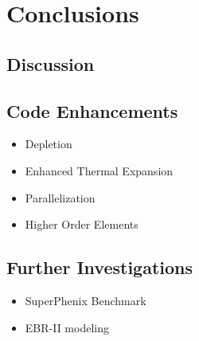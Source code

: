 \chapter{Conclusions}
\label{ch:conclusions}

\section{Discussion}

\section{Code Enhancements}
  \begin{itemize}
    \item Depletion
    \item Enhanced Thermal Expansion
    \item Parallelization
    \item Higher Order Elements
  \end{itemize}

\section{Further Investigations}
  \begin{itemize}
    \item SuperPhenix Benchmark
    \item EBR-II modeling
  \end{itemize}
